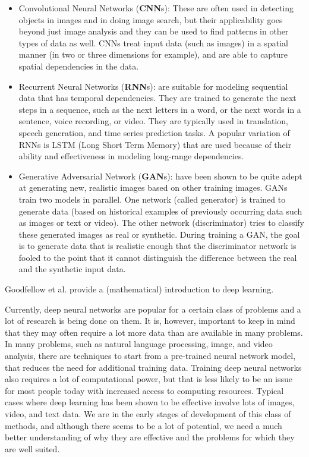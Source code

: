 \documentclass[]{krantz}
\begin{document}
\begin{itemize}
\item
  Convolutional Neural Networks (\textbf{CNN}s): These are often used in
  detecting objects in images and in doing image search, but their
  applicability goes beyond just image analysis and they can be used to
  find patterns in other types of data as well. CNNs treat input data
  (such as images) in a spatial manner (in two or three dimensions for
  example), and are able to capture spatial dependencies in the data.
\item
  Recurrent Neural Networks (\textbf{RNN}s): are suitable for modeling
  sequential data that has temporal dependencies. They are trained to
  generate the next steps in a sequence, such as the next letters in a
  word, or the next words in a sentence, voice recording, or video. They
  are typically used in translation, speech generation, and time series
  prediction tasks. A popular variation of RNNs is LSTM (Long Short Term
  Memory) that are used because of their ability and effectiveness in
  modeling long-range dependencies.
\item
  Generative Adversarial Network (\textbf{GAN}s): have been shown to be
  quite adept at generating new, realistic images based on other
  training images. GANs train two models in parallel. One network
  (called generator) is trained to generate data (based on historical
  examples of previously occurring data such as images or text or
  video). The other network (discriminator) tries to classify these
  generated images as real or synthetic. During training a GAN, the goal
  is to generate data that is realistic enough that the discriminator
  network is fooled to the point that it cannot distinguish the
  difference between the real and the synthetic input data.
\end{itemize}

Goodfellow et al. \citeyearpar{Goodfellow2016} provide a (mathematical)
introduction to deep learning.

Currently, deep neural networks are popular for a certain class of
problems and a lot of research is being done on them. It is, however,
important to keep in mind that they may often require a lot more data
than are available in many problems. In many problems, such as natural
language processing, image, and video analysis, there are techniques to
start from a pre-trained neural network model, that reduces the need for
additional training data. Training deep neural networks also requires a
lot of computational power, but that is less likely to be an issue for
most people today with increased access to computing resources. Typical
cases where deep learning has been shown to be effective involve lots of
images, video, and text data. We are in the early stages of development
of this class of methods, and although there seems to be a lot of
potential, we need a much better understanding of why they are effective
and the problems for which they are well suited.
\end{document}
